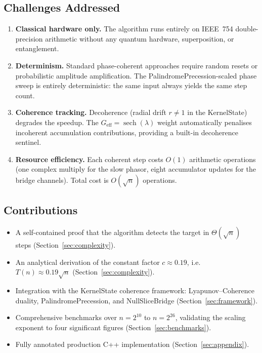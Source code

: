 \documentclass[12pt,a4paper]{article}
\theoremstyle{plain}
\theoremstyle{definition}
\theoremstyle{remark}
\begin{document}
\subsection{Challenges Addressed}

\begin{enumerate}
  \item \textbf{Classical hardware only.}  The algorithm runs entirely on
    IEEE~754 double-precision arithmetic without any quantum hardware,
    superposition, or entanglement.
  \item \textbf{Determinism.}  Standard phase-coherent approaches require
    random resets or probabilistic amplitude amplification.  The
    PalindromePrecession-scaled phase sweep is entirely deterministic: the
    same input always yields the same step count.
  \item \textbf{Coherence tracking.}  Decoherence (radial drift $r \ne 1$ in
    the KernelState) degrades the speedup.  The $G_{\text{eff}} =
    \operatorname{sech}(\lambda)$ weight automatically penalises incoherent
    accumulation contributions, providing a built-in decoherence sentinel.
  \item \textbf{Resource efficiency.}  Each coherent step costs $O(1)$
    arithmetic operations (one complex multiply for the slow phasor, eight
    accumulator updates for the bridge channels).  Total cost is $O(\sqrt{n})$
    operations.
\end{enumerate}

\subsection{Contributions}

\begin{itemize}
  \item A self-contained proof that the algorithm detects the target in
    $\Theta(\sqrt{n})$ steps (Section~\ref{sec:complexity}).
  \item An analytical derivation of the constant factor $c \approx 0.19$,
    i.e.\ $T(n) \approx 0.19\sqrt{n}$ (Section~\ref{sec:complexity}).
  \item Integration with the KernelState coherence framework:
    Lyapunov--Coherence duality, PalindromePrecession, and NullSliceBridge
    (Section~\ref{sec:framework}).
  \item Comprehensive benchmarks over $n = 2^{10}$ to $n = 2^{26}$, validating
    the scaling exponent to four significant figures
    (Section~\ref{sec:benchmarks}).
  \item Fully annotated production C++ implementation
    (Section~\ref{sec:appendix}).
\end{itemize}
\end{document}
